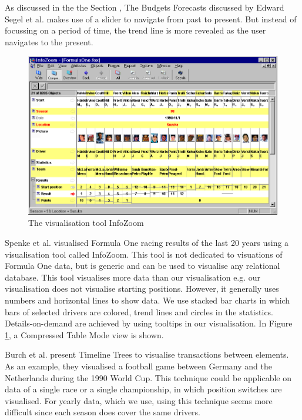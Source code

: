 \documentclass{sigchi}
\begin{document}
As discussed in the the Section , The Budgets Forecasts discussed by Edward Segel et al. \cite{segel2010narrative} makes use of a slider to navigate from past to present. But instead of focussing on a period of time, the trend line is more revealed as the user navigates to the present.

\begin{figure}[ht]
  \centering
  \includegraphics[width=1\columnwidth]{images/infozoom.png}
  \caption{The visualisation tool InfoZoom}
  \label{fig:infozoom}
\end{figure}


Spenke et al.\cite{spenke2000infozoom} visualised Formula One racing results of the last 20 years using a visualisation tool called InfoZoom. This tool is not dedicated to visuations of Formula One data, but is generic and can be used to visualise any relational database. This tool visualises more data than our visualisation e.g. our visualisation does not visualise starting positions. However, it generally uses numbers and horizontal lines to show data. We use stacked bar charts in which bars of selected drivers are colored, trend lines and circles in the statistics. Details-on-demand are achieved by using tooltips in our visualisation. In Figure \ref{fig:infozoom}, a Compressed Table Mode view is shown.


Burch et al.\cite{burch2008timeline} present Timeline Trees to visualise transactions between elements. As an example, they visualised a football game between Germany and the Netherlands during the 1990 World Cup. This technique could be applicable on data of a single race or a single championship, in which position switches are visualised. For yearly data, which we use, using this technique seems more difficult since each season does cover the same drivers. 
\end{document}

